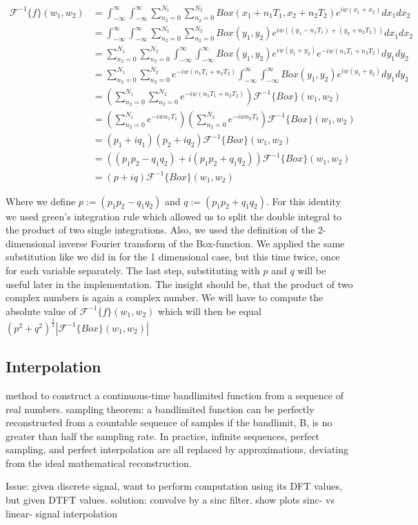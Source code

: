 \begin{align*}
\mathcal{F}^{-1}\{f\}(w_1,w_2)
& = \int_{-\infty}^{\infty}\int_{-\infty}^{\infty} \sum_{n_2=0}^{N_1} \sum_{n_2=0}^{N_2} Box(x_1 + n_1 T_1, x_2 + n_2 T_2) e^{iw(x_1 + x_2)}dx_1 dx_2 \\
& = \int_{-\infty}^{\infty}\int_{-\infty}^{\infty} \sum_{n_2=0}^{N_1} \sum_{n_2=0}^{N_2} Box(y_1, y_2) e^{iw((y_1 - n_1 T_1) + (y_2 + n_2 T_2))}dx_1 dx_2 \\
& =\sum_{n_2=0}^{N_1} \sum_{n_2=0}^{N_2} \int_{-\infty}^{\infty}\int_{-\infty}^{\infty} Box(y_1, y_2) e^{iw(y_1 + y_2)} e^{-iw(n_1 T_1 + n_2 T_2)}dy_1 dy_2 \\
& =\sum_{n_2=0}^{N_1} \sum_{n_2=0}^{N_2} e^{-iw(n_1 T_1 + n_2 T_2)} \int_{-\infty}^{\infty}\int_{-\infty}^{\infty} Box(y_1, y_2) e^{iw(y_1 + y_2)} dy_1 dy_2 \\
& =\left(\sum_{n_2=0}^{N_1} \sum_{n_2=0}^{N_2} e^{-iw(n_1 T_1 + n_2 T_2)}\right) \mathcal{F}^{-1}\{Box\}(w_1,w_2) \\
& =\left(\sum_{n_2=0}^{N_1} e^{-iw n_1 T_1}\right) \left(\sum_{n_2=0}^{N_2} e^{-iw n_2 T_2}\right) \mathcal{F}^{-1}\{Box\}(w_1,w_2) \\
& =(p_1 + i q_1)(p_2 + i q_2) \mathcal{F}^{-1}\{Box\}(w_1,w_2) \\
& =((p_1 p_2 - q_1 q_2) + i(p_1 p_2 + q_1 q_2)) \mathcal{F}^{-1}\{Box\}(w_1,w_2) \\
& =(p + iq) \mathcal{F}^{-1}\{Box\}(w_1,w_2)
\end{align*}

Where we define $p := (p_1 p_2 - q_1 q_2) $ and $q := (p_1 p_2 + q_1 q_2)$. For this identity we used green's integration rule which allowed us to split the double integral to the product of two single integrations. Also, we used the definition of the 2-dimensional inverse Fourier transform of the Box-function. We applied the same substitution like we did in for the 1 dimensional case, but this time twice, once for each variable separately. The last step, substituting with $p$ and $q$ will be useful later in the implementation. The insight should be, that the product of two complex numbers is again a complex number. We will have to compute the absolute value of $\mathcal{F}^{-1}\{f\}(w_1,w_2)$ which will then be equal $(p^2 + q^2)^{\frac{1}{2}}\left|\mathcal{F}^{-1}\{Box\}(w_1,w_2)\right|$


\subsection{Interpolation}
method to construct a continuous-time bandlimited function from a sequence of real numbers. 
sampling theorem: a bandlimited function can be perfectly reconstructed from a countable sequence of samples if the bandlimit, B, is no greater than half the sampling rate.
In practice, infinite sequences, perfect sampling, and perfect interpolation are all replaced by approximations, deviating from the ideal mathematical reconstruction.

Issue: given discrete signal, want to perform computation using its DFT values, but given DTFT values. solution: convolve by a sinc filter. 
show plots sinc- vs linear- signal interpolation 

